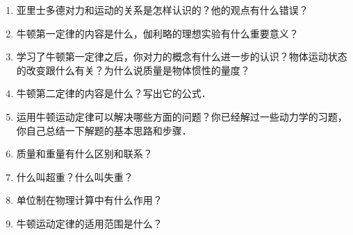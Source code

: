 \begin{enumerate}
    \item 亚里士多德对力和运动的关系是怎样认识的？他的观点有什么错误？
    \item 牛顿第一定律的内容是什么，伽利略的理想实验有什么重要意义？
    \item 学习了牛顿第一定律之后，你对力的概念有什么进一步的认识？物体运动状态的改变跟什么有关？为什么说质量是物体惯性的量度？
    \item 牛顿第二定律的内容是什么？写出它的公式．
    \item 运用牛顿运动定律可以解决哪些方面的问题？你已经解过一些动力学的习题，你自己总结一下解题的基本思路和步骤．
    \item 质量和重量有什么区别和联系？
    \item 什么叫超重？什么叫失重？
    \item 单位制在物理计算中有什么作用？
    \item 牛顿运动定律的适用范围是什么？
\end{enumerate}
\newpage

